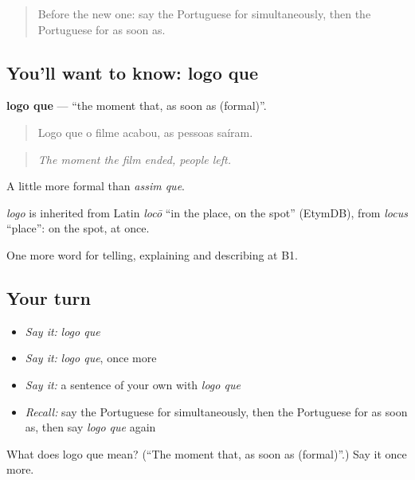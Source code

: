 \begin{quote}
Before the new one: say the Portuguese for simultaneously, then the Portuguese for as soon as.
\end{quote}

\subsection*{You'll want to know: logo que}
\textbf{logo que} — \textquotedblleft{}the moment that, as soon as (formal)\textquotedblright{}.

\begin{quote}
Logo que o filme acabou, as pessoas saíram.
\end{quote}

\begin{quote}
\emph{The moment the film ended, people left.}
\end{quote}

A little more formal than \emph{assim que}.

\begin{cousinweb}
\emph{logo} is inherited from Latin \emph{locō} \textquotedblleft{}in the place, on the spot\textquotedblright{} (EtymDB), from \emph{locus} \textquotedblleft{}place\textquotedblright{}: on the spot, at once.
\end{cousinweb}

\begin{grammarlens}[title={What you've built}]
One more word for telling, explaining and describing at B1.
\end{grammarlens}

\subsection*{Your turn}
\begin{itemize}
\raggedright
  \item \emph{Say it:} \emph{logo que}
  \item \emph{Say it:} \emph{logo que}, once more
  \item \emph{Say it:} a sentence of your own with \emph{logo que}
  \item \emph{Recall:} say the Portuguese for simultaneously, then the Portuguese for as soon as, then say \emph{logo que} again
\end{itemize}

\begin{tcolorbox}[breakable,colback=teal!4,colframe=teal!35!black,title={Before you move on}]
What does logo que mean? (\textquotedblleft{}The moment that, as soon as (formal)\textquotedblright{}.) Say it once more.
\end{tcolorbox}
